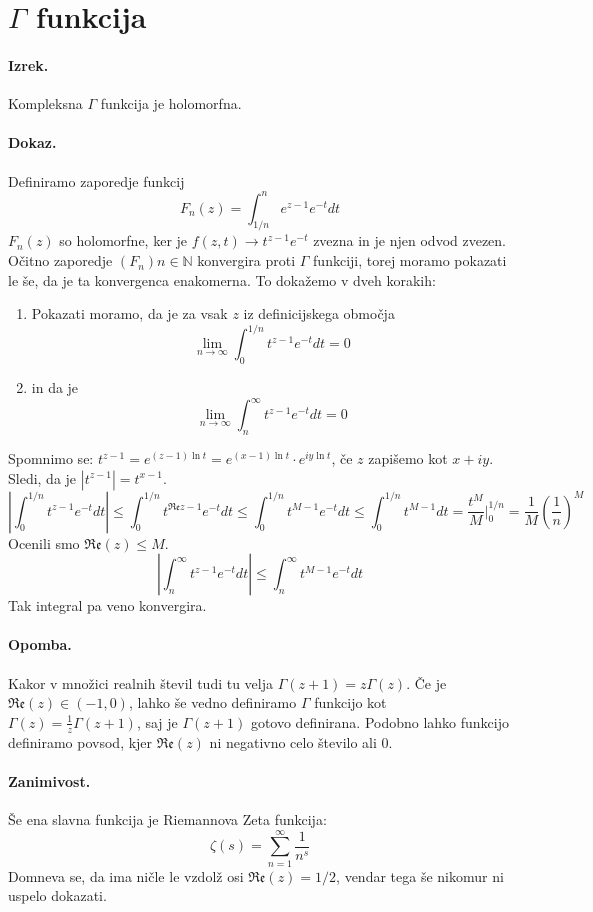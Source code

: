 \documentclass[a4paper]{article}
\newcommand{\N}{\mathbb{N}}
\newcommand{\Sum}[2][0]{\sum_{{#2} = {#1}}^{\infty}}
\newcommand{\Lim}[1]{\lim_{{#1} \rightarrow \infty}}
\begin{document}
\section{$\Gamma$ funkcija}
\paragraph{Izrek.} Kompleksna $\Gamma$ funkcija je holomorfna.
\paragraph{Dokaz.} Definiramo zaporedje funkcij $$F_n(z)=\int_{1/n}^{n}e^{z-1}e^{-t}dt$$
$F_n(z)$ so holomorfne, ker je $f(z, t) \to t^{z-1}e^{-t}$ zvezna in je njen odvod zvezen. Očitno zaporedje $(F_n)n\in\N$ konvergira proti $\Gamma$ funkciji,
torej moramo pokazati le še, da je ta konvergenca enakomerna. To dokažemo v dveh korakih: \\
\begin{enumerate}
    \item Pokazati moramo, da je za vsak $z$ iz definicijskega območja $$\Lim{n} \int_{0}^{1/n} t^{z-1}e^{-t}dt = 0$$
    \item in da je $$\Lim{n} \int_{n}^{\infty} t^{z-1}e^{-t}dt = 0$$
\end{enumerate}
Spomnimo se: $\displaystyle{t^{z-1} = e^{(z-1)\ln t}} = e^{(x-1)\ln t}\cdot e^{iy\ln t}$, če $z$ zapišemo kot $x + iy$. Sledi, da je $\displaystyle{|t^{z-1}| = t^{x-1}}$. \\[3mm]
$$\left|\int_{0}^{1/n}t^{z-1}e^{-t} dt\right| \leq \int_{0}^{1/n} t^{\mathfrak{Re}z - 1} e^{-t}dt \leq \int_{0}^{1/n} t^{M-1}e^{-t}dt \leq \int_{0}^{1/n}t^{M-1}dt = \frac{t^{M}}{M}\Bigg|_{0}^{1/n} = \frac{1}{M}\left(\frac{1}{n}\right)^M$$
Ocenili smo $\mathfrak{Re}(z) \leq M$.
$$\left|\int_{n}^{\infty}t^{z-1}e^{-t}dt\right| \leq \int_{n}^{\infty} t^{M-1}e^{-t}dt$$
Tak integral pa veno konvergira.
\paragraph{Opomba.} Kakor v množici realnih števil tudi tu velja $\displaystyle{\Gamma(z+1)=z\Gamma(z)}$.
Če je $\mathfrak{Re}(z) \in (-1, 0)$, lahko še vedno definiramo $\Gamma$ funkcijo kot $\displaystyle{\Gamma(z) = \frac{1}{z}\Gamma(z+1)}$, saj je $\Gamma(z+1)$ gotovo definirana. Podobno lahko funkcijo definiramo povsod, kjer $\mathfrak{Re}(z)$ ni negativno celo število ali 0.
\paragraph{Zanimivost.} Še ena slavna funkcija je Riemannova Zeta funkcija:
$$\zeta(s) = \Sum[1]{n}\frac{1}{n^s}$$
Domneva se, da ima ničle le vzdolž osi $\mathfrak{Re}(z) = 1/2$, vendar tega še nikomur ni uspelo dokazati.
\end{document}
